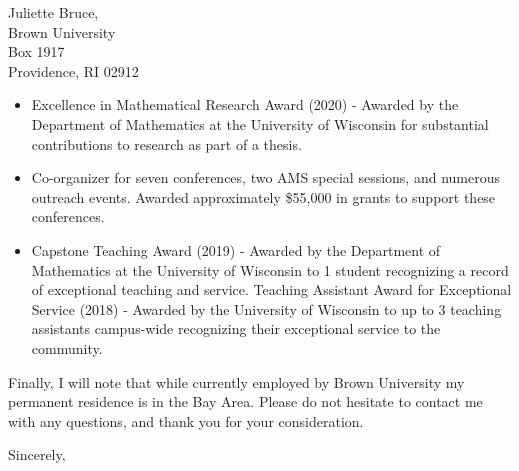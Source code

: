 \documentclass[11pt]{brownletter}
\begin{document}
\begin{letter}{Juliette Bruce,\\ 
               Brown University\\ 
               Box 1917\\ 
               Providence, RI 02912}
\begin{itemize}
\item Excellence in Mathematical Research Award (2020) - Awarded by the Department of Mathematics at the University of Wisconsin for substantial contributions to research as part of a thesis. %

\item Co-organizer for seven conferences, two AMS special sessions, and numerous outreach events. Awarded approximately \$55,000 in grants to support these conferences.  

\item Capstone Teaching Award (2019) - Awarded by the Department of Mathematics at the University of Wisconsin to 1 student recognizing a record of exceptional teaching and service. Teaching Assistant Award for Exceptional Service  (2018) - Awarded by the University of Wisconsin to up to 3 teaching assistants campus-wide recognizing their exceptional service to the community. 
\end{itemize}

Finally, I will note that while currently employed by Brown University my permanent residence is in the Bay Area. Please do not hesitate to contact me with any questions, and thank you for your consideration.

\closing{Sincerely,}




\end{letter}
\end{document}
